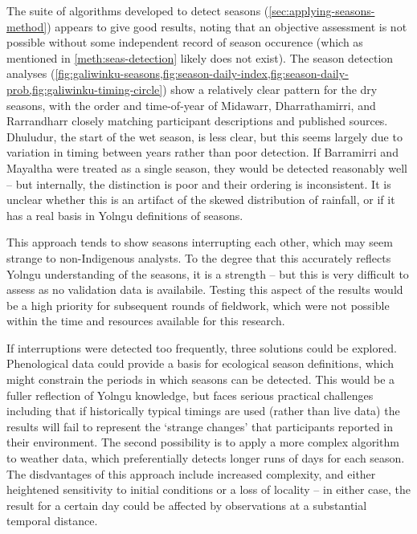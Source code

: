 The suite of algorithms developed to detect seasons (\cref{sec:applying-seasons-method})
appears to give good results, noting that an objective assessment is not
possible without some independent record of season occurence (which as
mentioned in \cref{meth:seas-detection} likely does not exist).
%
The season detection analyses
(\cref{fig:galiwinku-seasons,fig:season-daily-index,fig:season-daily-prob,fig:galiwinku-timing-circle})
show a relatively clear pattern for the
dry seasons, with the order and time-of-year of Midawarr, Dharrathamirri, and
Rarrandharr closely matching participant descriptions and published sources.
Dhuludur, the start of the wet season, is less clear, but this seems largely due to variation in timing between
years rather than poor detection.  If Barramirri and Mayaltha were treated as
a single season, they would be detected reasonably well -- but internally,
the distinction is poor and their ordering is inconsistent. It is unclear
whether this is an artifact of the skewed distribution of rainfall,
or if it has a real basis in Yolngu definitions of seasons.


This approach tends to show seasons interrupting each other, which may
seem strange to non-Indigenous analysts.  To the degree that this accurately
reflects Yolngu understanding of the seasons, it is a strength -- but this is
very difficult to assess as no validation data is availabile.  Testing this aspect of the
results would be a high priority for subsequent rounds of fieldwork, which
were not possible within the time and resources available for this research.

If interruptions were detected too frequently, three solutions could be explored.
Phenological data could provide a basis for ecological season definitions,
which might constrain the periods in which seasons can be detected.
This would be a fuller reflection of Yolngu knowledge, but faces serious
practical challenges including that if historically typical timings are used
(rather than live data) the results will fail to represent the `strange changes'
that participants reported in their environment.
%
The second  possibility is to apply a more complex algorithm to weather data,
which preferentially detects longer runs of days for each season.  The disdvantages
of this approach include increased complexity, and either heightened sensitivity
to initial conditions or a loss of locality -- in either case, the result for
a certain day could be affected by observations at a substantial temporal distance.
%


